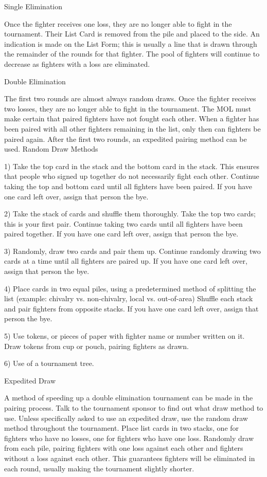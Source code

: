 \documentclass{article}
\begin{document}
Single Elimination

Once the fighter receives one loss, they are no longer able to fight in the tournament. Their List Card is
removed from the pile and placed to the side. An indication is made on the List Form; this is usually a line
that is drawn through the remainder of the rounds for that fighter. The pool of fighters will continue to
decrease as fighters with a loss are eliminated.

Double Elimination

The first two rounds are almost always random draws. Once the fighter receives two losses, they are no
longer able to fight in the tournament. The MOL must make certain that paired fighters have not fought
each other. When a fighter has been paired with all other fighters remaining in the list, only then can
fighters be paired again. After the first two rounds, an expedited pairing method can be used.
Random Draw Methods

1) Take the top card in the stack and the bottom card in the stack. This ensures that people who signed up
together do not necessarily fight each other. Continue taking the top and bottom card until all fighters
have been paired. If you have one card left over, assign that person the bye.

2) Take the stack of cards and shuffle them thoroughly. Take the top two cards; this is your first pair.
Continue taking two cards until all fighters have been paired together. If you have one card left over,
assign that person the bye.

3) Randomly, draw two cards and pair them up. Continue randomly drawing two cards at a time until all
fighters are paired up. If you have one card left over, assign that person the bye.

4) Place cards in two equal piles, using a predetermined method of splitting the list (example: chivalry vs.
non-chivalry, local vs. out-of-area) Shuffle each stack and pair fighters from opposite stacks. If you
have one card left over, assign that person the bye.

5) Use tokens, or pieces of paper with fighter name or number written on it. Draw tokens from cup or
pouch, pairing fighters as drawn.

6) Use of a tournament tree.

Expedited Draw

A method of speeding up a double elimination tournament can be made in the pairing process. Talk to the
tournament sponsor to find out what draw method to use. Unless specifically asked to use an expedited
draw, use the random draw method throughout the tournament.
Place list cards in two stacks, one for fighters who have no losses, one for fighters who have one loss.
Randomly draw from each pile, pairing fighters with one loss against each other and fighters without a
loss against each other. This guarantees fighters will be eliminated in each round, usually making the
tournament slightly shorter.
\end{document}
